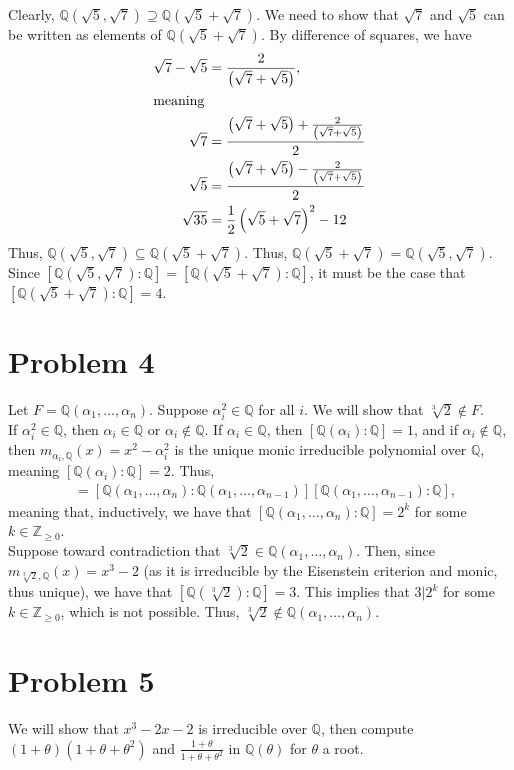 \documentclass[11pt]{extarticle}
\newcommand{\Q}{\mathbb{Q}}
\newcommand{\Z}{\mathbb{Z}}
\begin{document}
  Clearly, $\Q(\sqrt{5},\sqrt{7})\supseteq \Q(\sqrt{5} + \sqrt{7})$. We need to show that $\sqrt{7}$ and $\sqrt{5}$ can be written as elements of $\Q(\sqrt{5} + \sqrt{7})$. By difference of squares, we have
  \begin{align*}
    \sqrt{7} - \sqrt{5} &= \frac{2}{\left(\sqrt{7} + \sqrt{5}\right)},\\
    \intertext{meaning}
    \sqrt{7} &= \frac{\left(\sqrt{7} + \sqrt{5}\right) + \frac{2}{\left(\sqrt{7} + \sqrt{5}\right)}}{2}\\
    \sqrt{5} &= \frac{\left(\sqrt{7} + \sqrt{5}\right) - \frac{2}{\left(\sqrt{7} + \sqrt{5}\right)}}{2}\\
    \sqrt{35} &= \frac{1}{2}\left(\sqrt{5} + \sqrt{7}\right)^2 - 12
  \end{align*}
  Thus, $\Q(\sqrt{5},\sqrt{7})\subseteq \Q(\sqrt{5} + \sqrt{7})$. Thus, $\Q(\sqrt{5} + \sqrt{7}) = \Q(\sqrt{5},\sqrt{7})$. Since $[\Q(\sqrt{5},\sqrt{7}):\Q] = [\Q(\sqrt{5} + \sqrt{7}):\Q]$, it must be the case that $[\Q(\sqrt{5} + \sqrt{7}):\Q] = 4$.
  \section{Problem 4}%
  Let $F = \Q(\alpha_1,\dots,\alpha_n)$. Suppose $\alpha_i^2\in \Q$ for all $i$. We will show that $\sqrt[3]{2}\notin F$.\\

  If $\alpha_i^2\in \Q$, then $\alpha_i \in \Q$ or $\alpha_i \notin \Q$. If $\alpha_i \in \Q$, then $[\Q(\alpha_i):\Q] = 1$, and if $\alpha_i \notin \Q$, then $m_{\alpha_i,\Q}(x) = x^2 - \alpha_i^2$ is the unique monic irreducible polynomial over $\Q$, meaning $[\Q(\alpha_i):\Q] = 2$. Thus,
  \begin{align*}
    [\Q(\alpha_1,\dots,\alpha_n):\Q] &= [\Q(\alpha_1,\dots,\alpha_n):\Q(\alpha_1,\dots,\alpha_{n-1})][\Q(\alpha_1,\dots,\alpha_{n-1}):\Q],
  \end{align*}
  meaning that, inductively, we have that $[\Q(\alpha_1,\dots,\alpha_n):\Q] = 2^{k}$ for some $k\in \Z_{\geq 0}$.\\

  Suppose toward contradiction that $\sqrt[3]{2}\in \Q(\alpha_1,\dots,\alpha_n)$. Then, since $m_{\sqrt[3]{2},\Q}(x) = x^3 - 2$ (as it is irreducible by the Eisenstein criterion and monic, thus unique), we have that $[\Q(\sqrt[3]{2}):\Q] = 3$. This implies that $3|2^{k}$ for some $k\in \Z_{\geq 0}$, which is not possible. Thus, $\sqrt[3]{2}\notin \Q(\alpha_1,\dots,\alpha_n)$.
  \section{Problem 5}%
  We will show that $x^3 - 2x - 2$ is irreducible over $\Q$, then compute $(1+\theta)(1+\theta + \theta^2)$ and $\frac{1+\theta}{1+\theta+\theta^2}$ in $\Q(\theta)$ for $\theta$ a root.\\
\end{document}
